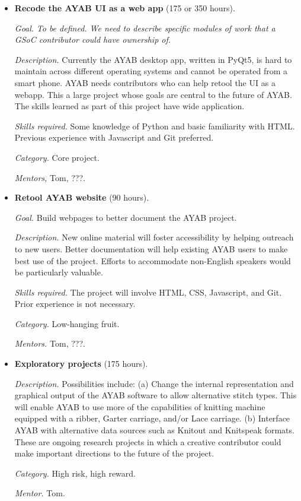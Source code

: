 \documentclass{article}
\begin{document}
\begin{itemize}
\item \textbf{Recode the AYAB UI as a web app} (175 or 350 hours). 

\textit{Goal.} {\itshape To be defined. We need to describe specific modules of work that a GSoC contributor could have ownership of.}

\textit{Description.} Currently the AYAB desktop app, written in PyQt5, is hard to maintain across different operating systems and cannot be operated from a smart phone. AYAB needs contributors who can help retool the UI as a webapp. This a large project whose goals are central to the future of AYAB. The skills learned as part of this project have wide application.

\textit{Skills required.} Some knowledge of Python and basic familiarity with HTML. Previous experience with Javascript and Git preferred.

\textit{Category.} Core project. 

\textit{Mentors,} Tom, ???.


\item \textbf{Retool AYAB website} (90 hours). 

\textit{Goal.} Build webpages to better document the AYAB project. 

\textit{Description.} New online material will foster accessibility by helping outreach to new users. Better documentation will help existing AYAB users to make best use of the project. Efforts to accommodate non-English speakers would be particularly valuable.

\textit{Skills required.} The project will involve HTML, CSS, Javascript, and Git. Prior experience is not necessary.

\textit{Category.} Low-hanging fruit. 

\textit{Mentors.} Tom, ???.


\item \textbf{Exploratory projects} (175 hours). 

\textit{Description.} Possibilities include: (a) Change the internal representation and graphical output of the AYAB software to allow alternative stitch types. This will enable AYAB to use more of the capabilities of knitting machine equipped with a ribber, Garter carriage, and/or Lace carriage. (b) Interface AYAB with alternative data sources such as Knitout and Knitspeak formats. These are ongoing research projects in which a creative contributor could make important directions to the future of the project.

\textit{Category.} High risk, high reward.

\textit{Mentor.} Tom.
\end{itemize}
\end{document}
